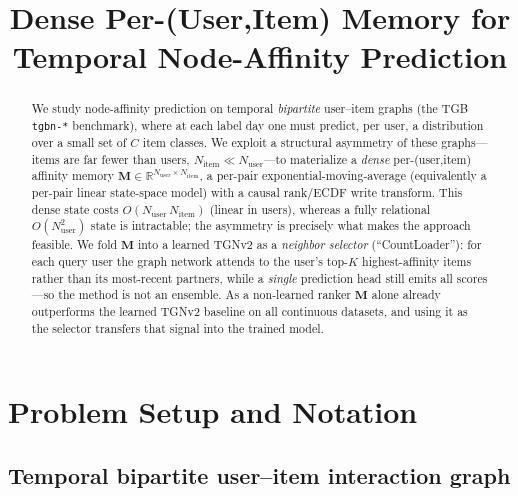 \documentclass[11pt]{article}
\title{Dense Per-(User,Item) Memory for Temporal Node-Affinity Prediction}
\author{}
\date{}
\begin{document}
\maketitle

\begin{abstract}
We study node-affinity prediction on temporal \emph{bipartite} user--item graphs
(the TGB \texttt{tgbn-*} benchmark), where at each label day one must predict, per
user, a distribution over a small set of $C$ item classes. We exploit a structural
asymmetry of these graphs---items are far fewer than users, $N_{\text{item}}\ll
N_{\text{user}}$---to materialize a \emph{dense} per-(user,item) affinity memory
$\mathbf{M}\in\mathbb{R}^{N_{\text{user}}\times N_{\text{item}}}$, a per-pair
exponential-moving-average (equivalently a per-pair linear state-space model) with a
causal rank/ECDF write transform. This dense state costs $O(N_{\text{user}}\,
N_{\text{item}})$ (linear in users), whereas a fully relational $O(N_{\text{user}}^2)$
state is intractable; the asymmetry is precisely what makes the approach feasible.
We fold $\mathbf{M}$ into a learned TGNv2 as a \emph{neighbor selector}
(``CountLoader''): for each query user the graph network attends to the user's
top-$K$ highest-affinity items rather than its most-recent partners, while a
\emph{single} prediction head still emits all scores---so the method is not an
ensemble. As a non-learned ranker $\mathbf{M}$ alone already outperforms the learned
TGNv2 baseline on all continuous datasets, and using it as the selector transfers
that signal into the trained model.
\end{abstract}


\section{Problem Setup and Notation}
\label{sec:setup}

\subsection{Temporal bipartite user--item interaction graph}
\end{document}

